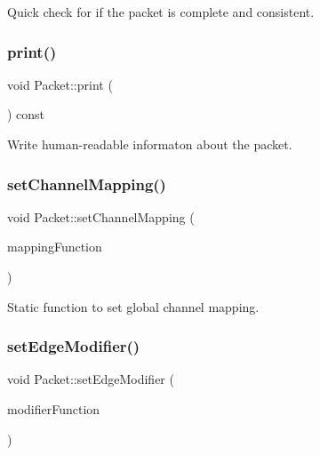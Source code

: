 Quick check for if the packet is complete and consistent. 

\mbox{\label{class_packet_aec87fc2f2473111a694ad8b6f60e7666}} 
\subsubsection{\texorpdfstring{print()}{print()}}
{\footnotesize\ttfamily void Packet\+::print (\begin{DoxyParamCaption}{ }\end{DoxyParamCaption}) const}



Write human-\/readable informaton about the packet. 

\mbox{\label{class_packet_a7aaddc94f0d5020e68e7d93daf2f22a1}} 
\subsubsection{\texorpdfstring{set\+Channel\+Mapping()}{setChannelMapping()}}
{\footnotesize\ttfamily void Packet\+::set\+Channel\+Mapping (\begin{DoxyParamCaption}\item[{std\+::function$<$ unsigned int(const \hyperlink{class_board_identifier}{Board\+Identifier} \&, const unsigned int, const unsigned int)$>$}]{mapping\+Function }\end{DoxyParamCaption})\hspace{0.3cm}{\ttfamily [static]}}



Static function to set global channel mapping. 

\mbox{\label{class_packet_aa36c09e150aa9ff144365a88cdb3edfd}} 
\subsubsection{\texorpdfstring{set\+Edge\+Modifier()}{setEdgeModifier()}}
{\footnotesize\ttfamily void Packet\+::set\+Edge\+Modifier (\begin{DoxyParamCaption}\item[{std\+::function$<$ void(unsigned int \&)$>$}]{modifier\+Function }\end{DoxyParamCaption})\hspace{0.3cm}{\ttfamily [static]}}



